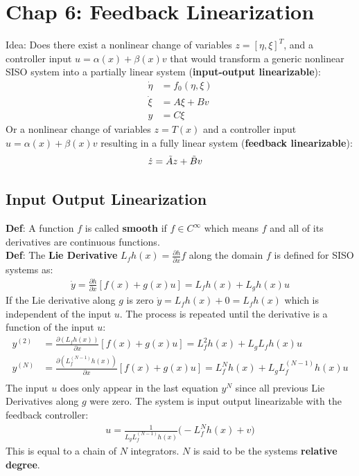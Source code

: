 \section{Chap 6: Feedback Linearization}
Idea: Does there exist a nonlinear change of variables $z = [\eta,\xi]^T$, and a controller input $u = \alpha(x) + \beta(x)v$ that would transform a generic nonlinear SISO system into a partially linear system (\textbf{input-output linearizable}):
\begin{align*}
    \Dot{\eta} & = f_0(\eta,\xi) \\
    \Dot{\xi}  & = A\xi + Bv     \\
    y          & = C\xi
\end{align*}
Or a nonlinear change of variables $z = T(x)$ and a controller input $u = \alpha(x) + \beta(x)v$ resulting in a fully linear system (\textbf{feedback linearizable}):
\begin{align*}
    \Dot{z} & = \Tilde{A}z + \Tilde{B}v
\end{align*}
\subsection{Input Output Linearization}
\textbf{Def}: A function $f$ is called \textbf{smooth} if $f\in C^\infty$ which means $f$ and all of its derivatives are continuous functions.\\
\textbf{Def}: The \textbf{Lie Derivative} $L_f h(x) = \frac{\partial h}{\partial x}f$ along the domain $f$ is defined for SISO systems as:
\begin{align*}
    \Dot{y} = \frac{\partial h}{\partial x} [f(x) + g(x)u] = L_f h(x) + L_g h(x)u
\end{align*}
If the Lie derivative along $g$ is zero $\Dot{y} = L_f h(x) + 0 = L_f h(x)$ which is independent of the input $u$. The process is repeated until the derivative is a function of the input $u$:
\begin{align*}
    y^{(2)} & = \frac{\partial (L_f h(x))}{\partial x}[f(x) + g(x)u] = L_f^2 h(x) + L_g L_f h(x) u                 \\
    y^{(N)} & = \frac{\partial (L_f^{(N-1)} h(x))}{\partial x}[f(x) + g(x)u] = L_f^N h(x) + L_g L_f^{(N-1)} h(x) u \\
\end{align*}
The input $u$ does only appear in the last equation $y^{N}$ since all previous Lie Derivatives along $g$ were zero. The system is input output linearizable with the feedback controller:
\begin{align*}
    \boxed{u = \frac{1}{L_g L_f^{(N-1)}h(x)} \Big(-L_f^N h(x) + v \Big)}
\end{align*}
This is equal to a chain of $N$ integrators. $N$ is said to be the systems \textbf{relative degree}.\\
